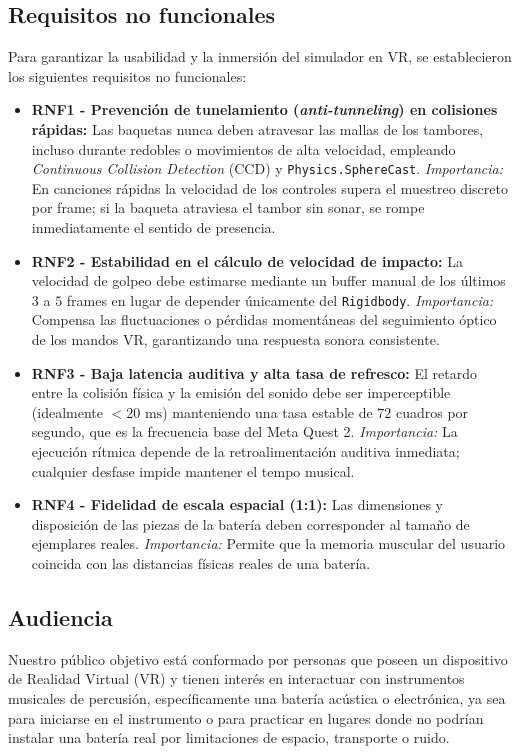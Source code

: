 \documentclass{article}
\begin{document}
\subsection{Requisitos no funcionales}
Para garantizar la usabilidad y la inmersión del simulador en VR, se establecieron los siguientes requisitos no funcionales:

\begin{itemize}
    \item \textbf{RNF1 - Prevención de tunelamiento (\textit{anti-tunneling}) en colisiones rápidas:} Las baquetas nunca deben atravesar las mallas de los tambores, incluso durante redobles o movimientos de alta velocidad, empleando \textit{Continuous Collision Detection} (CCD) y \texttt{Physics.SphereCast}. \textit{Importancia:} En canciones rápidas la velocidad de los controles supera el muestreo discreto por frame; si la baqueta atraviesa el tambor sin sonar, se rompe inmediatamente el sentido de presencia.
    \item \textbf{RNF2 - Estabilidad en el cálculo de velocidad de impacto:} La velocidad de golpeo debe estimarse mediante un buffer manual de los últimos $3$ a $5$ frames en lugar de depender únicamente del \texttt{Rigidbody}. \textit{Importancia:} Compensa las fluctuaciones o pérdidas momentáneas del seguimiento óptico de los mandos VR, garantizando una respuesta sonora consistente.
    \item \textbf{RNF3 - Baja latencia auditiva y alta tasa de refresco:} El retardo entre la colisión física y la emisión del sonido debe ser imperceptible (idealmente $<20\text{ ms}$) manteniendo una tasa estable de $72$ cuadros por segundo, que es la frecuencia base del Meta Quest 2. \textit{Importancia:} La ejecución rítmica depende de la retroalimentación auditiva inmediata; cualquier desfase impide mantener el tempo musical.
    \item \textbf{RNF4 - Fidelidad de escala espacial (1:1):} Las dimensiones y disposición de las piezas de la batería deben corresponder al tamaño de ejemplares reales. \textit{Importancia:} Permite que la memoria muscular del usuario coincida con las distancias físicas reales de una batería.
\end{itemize}

\subsection{Audiencia}
Nuestro público objetivo está conformado por personas que poseen un dispositivo de Realidad Virtual (VR) y tienen interés en interactuar con instrumentos musicales de percusión, específicamente una batería acústica o electrónica, ya sea para iniciarse en el instrumento o para practicar en lugares donde no podrían instalar una batería real por limitaciones de espacio, transporte o ruido.
\end{document}
